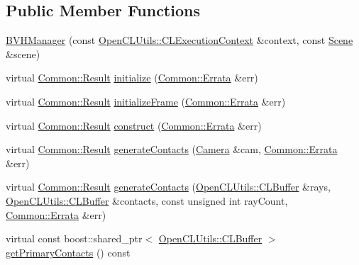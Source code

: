 \subsection*{Public Member Functions}
\begin{DoxyCompactItemize}
\item 
\hyperlink{class_c_l_ray_tracer_1_1_acceleration_structures_1_1_b_v_h_manager_a44c7d81fb8a8fbf07208219261233bf5}{B\+V\+H\+Manager} (const \hyperlink{class_c_l_ray_tracer_1_1_open_c_l_utils_1_1_c_l_execution_context}{Open\+C\+L\+Utils\+::\+C\+L\+Execution\+Context} \&context, const \hyperlink{class_c_l_ray_tracer_1_1_scene}{Scene} \&scene)
\item 
virtual \hyperlink{_errata_8h_a389396702f1aff6e71eb21328b0775c1}{Common\+::\+Result} \hyperlink{class_c_l_ray_tracer_1_1_acceleration_structures_1_1_b_v_h_manager_aa84f753d471803ed8d7df36ecd384d3b}{initialize} (\hyperlink{class_c_l_ray_tracer_1_1_common_1_1_errata}{Common\+::\+Errata} \&err)
\item 
virtual \hyperlink{_errata_8h_a389396702f1aff6e71eb21328b0775c1}{Common\+::\+Result} \hyperlink{class_c_l_ray_tracer_1_1_acceleration_structures_1_1_b_v_h_manager_a120b66507840a4e9b162ad4b3d863514}{initialize\+Frame} (\hyperlink{class_c_l_ray_tracer_1_1_common_1_1_errata}{Common\+::\+Errata} \&err)
\item 
virtual \hyperlink{_errata_8h_a389396702f1aff6e71eb21328b0775c1}{Common\+::\+Result} \hyperlink{class_c_l_ray_tracer_1_1_acceleration_structures_1_1_b_v_h_manager_a291018a731286a7f0d486b1cfc20bcdc}{construct} (\hyperlink{class_c_l_ray_tracer_1_1_common_1_1_errata}{Common\+::\+Errata} \&err)
\item 
virtual \hyperlink{_errata_8h_a389396702f1aff6e71eb21328b0775c1}{Common\+::\+Result} \hyperlink{class_c_l_ray_tracer_1_1_acceleration_structures_1_1_b_v_h_manager_acd5ef0664268cb587c5099b0994773a3}{generate\+Contacts} (\hyperlink{struct_camera}{Camera} \&cam, \hyperlink{class_c_l_ray_tracer_1_1_common_1_1_errata}{Common\+::\+Errata} \&err)
\item 
virtual \hyperlink{_errata_8h_a389396702f1aff6e71eb21328b0775c1}{Common\+::\+Result} \hyperlink{class_c_l_ray_tracer_1_1_acceleration_structures_1_1_b_v_h_manager_a632bf0cb2fdf48ce3f04b16a4f64e615}{generate\+Contacts} (\hyperlink{class_c_l_ray_tracer_1_1_open_c_l_utils_1_1_c_l_buffer}{Open\+C\+L\+Utils\+::\+C\+L\+Buffer} \&rays, \hyperlink{class_c_l_ray_tracer_1_1_open_c_l_utils_1_1_c_l_buffer}{Open\+C\+L\+Utils\+::\+C\+L\+Buffer} \&contacts, const unsigned int ray\+Count, \hyperlink{class_c_l_ray_tracer_1_1_common_1_1_errata}{Common\+::\+Errata} \&err)
\item 
virtual const boost\+::shared\+\_\+ptr$<$ \hyperlink{class_c_l_ray_tracer_1_1_open_c_l_utils_1_1_c_l_buffer}{Open\+C\+L\+Utils\+::\+C\+L\+Buffer} $>$ \hyperlink{class_c_l_ray_tracer_1_1_acceleration_structures_1_1_b_v_h_manager_aedde0f4455f69e2b7854b1aae0e3583b}{get\+Primary\+Contacts} () const 
\end{DoxyCompactItemize}
